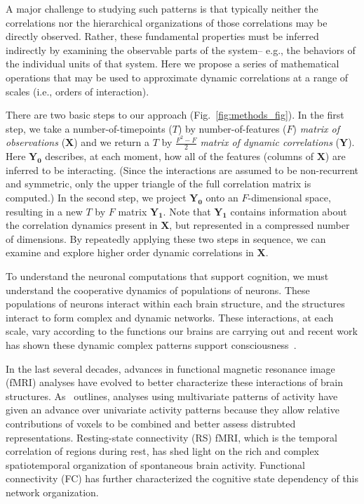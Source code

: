 A major challenge to studying such patterns is that typically neither
the correlations nor the hierarchical organizations of those
correlations may be directly observed.  Rather, these fundamental
properties must be inferred indirectly by examining the observable
parts of the system-- e.g., the behaviors of the individual units of
that system.  Here we propose a series of mathematical operations that may be used to approximate dynamic correlations at a range of scales (i.e., orders of interaction).

There are two basic steps to our approach (Fig.~\ref{fig:methods_fig}).  In the first step, we take
a number-of-timepoints ($T$) by number-of-features ($F$)
\textit{matrix of observations} ($\mathbf{X}$) and we return a $T$ by
$\frac{F^2 - F}{2}$ \textit{matrix of dynamic correlations}
($\mathbf{Y}$).  Here $\mathbf{Y_0}$ describes, at each moment, how
all of the features (columns of $\mathbf{X}$) are inferred to be
interacting.  (Since the interactions are assumed to be non-recurrent
and symmetric, only the upper triangle of the full correlation matrix
is computed.)  In the second step, we project $\mathbf{Y_0}$ onto an
$F$-dimensional space, resulting in a new $T$ by $F$ matrix
$\mathbf{Y_1}$.  Note that $\mathbf{Y_1}$ contains information about
the correlation dynamics present in $\mathbf{X}$, but represented in a
compressed number of dimensions.  By repeatedly applying these two
steps in sequence, we can examine and explore higher order dynamic
correlations in $\mathbf{X}$.

To understand the neuronal computations that support cognition, we
must understand the cooperative dynamics of populations of neurons.
These populations of neurons interact within each brain structure, and
the structures interact to form complex and dynamic networks. These
interactions, at each scale, vary according to the functions our
brains are carrying out and recent work has shown these dynamic
complex patterns support consciousness~\citep{DemeEtal19}.

In the last several decades, advances in functional magnetic resonance
image (fMRI) analyses have evolved to better characterize these
interactions of brain structures.  As~\cite{Turk13} outlines,
analyses using multivariate patterns of activity have given an advance
over univariate activity patterns because they allow relative
contributions of voxels to be combined and better assess distrubted
representations. Resting-state connectivity (RS) fMRI, which is the
temporal correlation of regions during rest, has shed light on the
rich and complex spatiotemporal organization of spontaneous brain
activity.  Functional connectivity (FC) has further characterized the
cognitive state dependency of this network organization.

